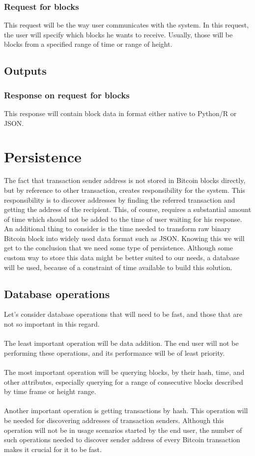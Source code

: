 \documentclass[12pt, en, eng, oneside, final]{mgr}
\begin{document}
\subsubsection{Request for blocks} This request will be the way user communicates with the system. In this request, the user will specify which blocks he wants to receive. Usually, those will be blocks from a specified range of time or range of height.

\subsection{Outputs}
\subsubsection{Response on request for blocks} This response will contain block data in format either native to Python/R or JSON.


\section{Persistence}
The fact that transaction sender address is not stored in Bitcoin blocks directly, but by reference to other transaction, creates responsibility for the system. This responsibility is to discover addresses by finding the referred transaction and getting the address of the recipient. This, of course, requires a substantial amount of time which should not be added to the time of user waiting for his response. 
\\
An additional thing to consider is the time needed to transform raw binary Bitcoin block into widely used data format such as JSON. Knowing this we will get to the conclusion that we need some type of persistence. Although some custom way to store this data might be better suited to our needs, a database will be used, because of a constraint of time available to build this solution.

\subsection{Database operations}
Let's consider database operations that will need to be fast, and those that are not so important in this regard.
\\
\\
The least important operation will be data addition. The end user will not be performing these operations, and its performance will be of least priority.
\\
\\
The most important operation will be querying blocks, by their hash, time, and other attributes, especially querying for a range of consecutive blocks described by time frame or height range.
\\
\\
Another important operation is getting transactions by hash. This operation will be needed for discovering addresses of transaction senders. Although this operation will not be in usage scenarios started by the end user, the number of such operations needed to discover sender address of every Bitcoin transaction makes it crucial for it to be fast.
\end{document}
